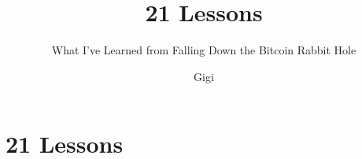 \documentclass[paper=6in:9in,pagesize=pdftex,
               headinclude=on,footinclude=on,12pt]{scrbook}
\begin{document}
\frontmatter

\title{21 Lessons}
\subtitle{What I've Learned from Falling Down the Bitcoin Rabbit Hole}
\author{Gigi}
\date{}

\maketitle

\cleardoublepage




\tableofcontents



\mainmatter

\part*{21 Lessons}




























\cleardoublepage



\listoffigures



\end{document}
